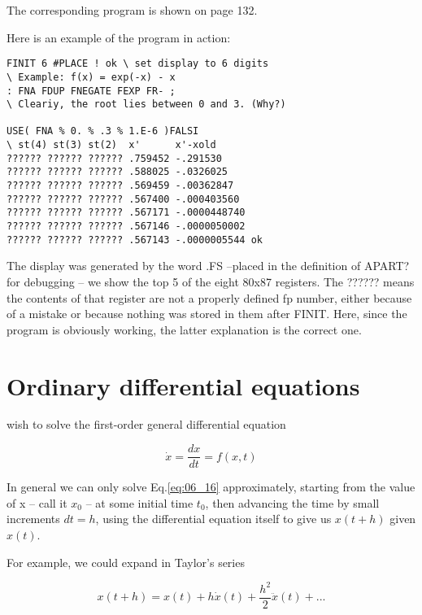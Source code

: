 The corresponding program is shown on page 132.

Here is an example of the program in action:

\begin{lstlisting}
FINIT 6 #PLACE ! ok \ set display to 6 digits
\ Example: f(x) = exp(-x) - x
: FNA FDUP FNEGATE FEXP FR- ;
\ Cleariy, the root lies between 0 and 3. (Why?)

USE( FNA % 0. % .3 % 1.E-6 )FALSI
\ st(4) st(3) st(2)  x'      x'-xold
?????? ?????? ?????? .759452 -.291530
?????? ?????? ?????? .588025 -.0326025
?????? ?????? ?????? .569459 -.00362847
?????? ?????? ?????? .567400 -.000403560
?????? ?????? ?????? .567171 -.0000448740
?????? ?????? ?????? .567146 -.0000050002
?????? ?????? ?????? .567143 -.0000005544 ok
\end{lstlisting}

The display was generated by the word .FS --placed in the
definition of APART? for debugging -- we show the top 5 of the eight 80x87 registers. The ?????? means the contents of that register are not a properly defined fp number, either because of a mistake or because nothing was stored in them after FINIT. Here, since the program is obviously working, the latter explanation is the correct one.

\section{Ordinary differential equations}
 wish to solve the first-order general differential equation

\begin{equation}
    \dot{x} = \frac{dx}{dt} = f(x,t)
    \label{eq:06_16} 
\end{equation}

In general we can only solve Eq.\ref{eq:06_16} approximately, starting from the value of x -- call it $x_0$ -- at some initial time $t_0$, then advancing the time by small increments $dt = h$, using the differential equation itself to give us $x(t+h)$ given $x(t)$.

For example, we could expand in Taylor's series

\begin{equation}
    x(t+h) = x(t) + h\dot{x}(t) + \frac{h^2}{2}\ddot{x}(t) + ...
    \label{eq:06_17} 
\end{equation}

